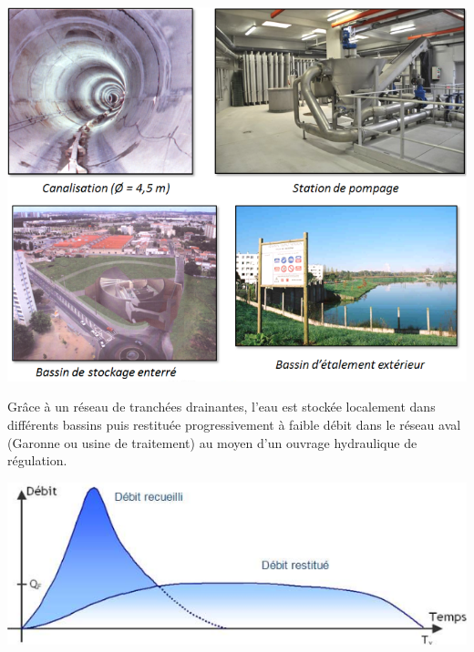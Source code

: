\documentclass[10pt]{article}
\begin{document}
\begin{center}
\includegraphics[width=.8\textwidth]{images/img2}
\end{center}


\begin{minipage}[c]{.35\linewidth}

Grâce à un réseau de tranchées drainantes, l’eau est stockée localement dans différents bassins puis restituée progressivement à faible débit dans le réseau aval (Garonne ou usine de traitement) au moyen d’un ouvrage hydraulique de régulation.  

\end{minipage}\hfill
\begin{minipage}[c]{.62\linewidth}
\begin{center}
\includegraphics[width=.95\textwidth]{images/img3}
\end{center}
\end{minipage}
\end{document}
